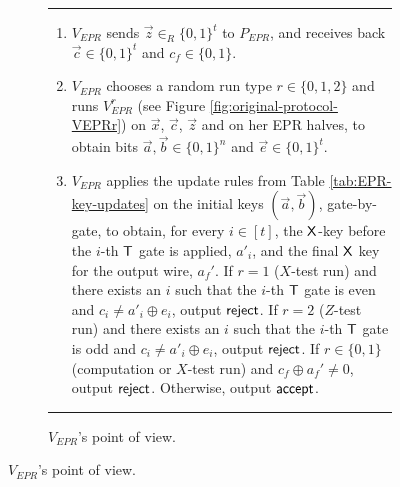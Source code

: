 \begin{figure}[htbp]
  \begin{subfigure}{\textwidth}
\rule[1ex]{\textwidth}{0.5pt}
\begin{enumerate}
\item $V_{EPR}$ sends $\vec{z}\in_R\{0,1\}^t$ to $P_{EPR}$,
and receives back $\vec{c}\in\{0,1\}^t$ and $c_f\in\{0,1\}$.
\item $V_{EPR}$ chooses a random run type $r\in\{0,1,2\}$ and runs $V_{EPR}^r$ (see Figure \ref{fig:original-protocol-VEPRr}) on $\vec{x}$, $\vec{c}$, $\vec{z}$ and on her EPR halves, to obtain bits $\vec{a},\vec{b}\in\{0,1\}^n$ and $\vec{e}\in\{0,1\}^t$. 
\item $V_{EPR}$ applies the update rules from Table \ref{tab:EPR-key-updates} on the initial keys $(\vec{a},\vec{b})$, gate-by-gate, to obtain, for every $i\in [t]$, the $\sf X$-key before the $i$-th $\sf T$ gate is applied, $a'_i$, and the final $\sf X$ key for the output wire, $a_f'$. If $r=1$ ($X$-test run) and there exists an $i$ such that the $i$-th $\sf T$ gate is even and $c_i\neq a'_i\oplus e_i$, output $\sf reject$. If $r=2$ ($Z$-test run) and there exists an $i$ such that the $i$-th $\sf T$ gate is odd and $c_i\neq a'_i\oplus e_i$, output $\sf reject$. If $r\in\{0,1\}$ (computation or $X$-test run) and $c_f\oplus a_f'\neq 0$, output $\sf reject$. Otherwise, output $\sf accept$. 
\end{enumerate}
\rule[2ex]{\textwidth}{0.5pt}\vspace{-.5cm}
    \caption{ $V_{EPR}$'s point of view.}
  \label{fig:original-protocol-VEPR}
    \end{subfigure}


\end{figure}
